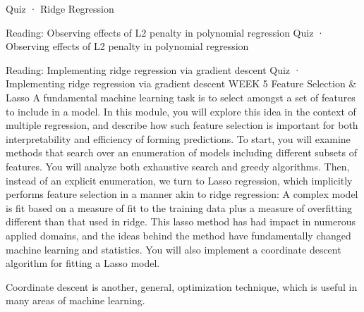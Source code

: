 Quiz · Ridge Regression
\item Reading: Observing effects of L2 penalty in polynomial regression
Quiz · Observing effects of L2 penalty in polynomial regression
\item Reading: Implementing ridge regression via gradient descent
Quiz · Implementing ridge regression via gradient descent
WEEK 5
Feature Selection & Lasso
A fundamental machine learning task is to select amongst a set of features to include in a model. In this module, you will explore this idea in the context of multiple regression, and describe how such feature selection is important for both interpretability and efficiency of forming predictions.
To start, you will examine methods that search over an enumeration of models including different subsets of features. You will analyze both exhaustive search and greedy algorithms. Then, instead of an explicit enumeration, we turn to Lasso regression, which implicitly performs feature selection in a manner akin to ridge regression: A complex model is fit based on a measure of fit to the training data plus a measure of overfitting different than that used in ridge. This lasso method has had impact in numerous applied domains, and the ideas behind the method have fundamentally changed machine learning and statistics. You will also implement a coordinate descent algorithm for fitting a Lasso model.

Coordinate descent is another, general, optimization technique, which is useful in many areas of machine learning.

